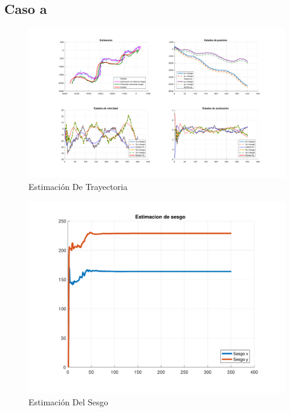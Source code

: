 
\subsection{Caso a}

	\begin{figure}[H]
		\centering
		\includegraphics[width=1.0\textwidth,keepaspectratio]{Figuras/graf_ej4a.pdf}
		\caption{Estimación De Trayectoria}
		\label{fig:ej4a}
	\end{figure}
	
	\begin{figure}[H]
		\centering
		\includegraphics[width=1.0\textwidth,keepaspectratio]{Figuras/bias_ej4a.pdf}
		\caption{Estimación Del Sesgo}
		\label{fig:ej4a_bias}
	\end{figure}
	
